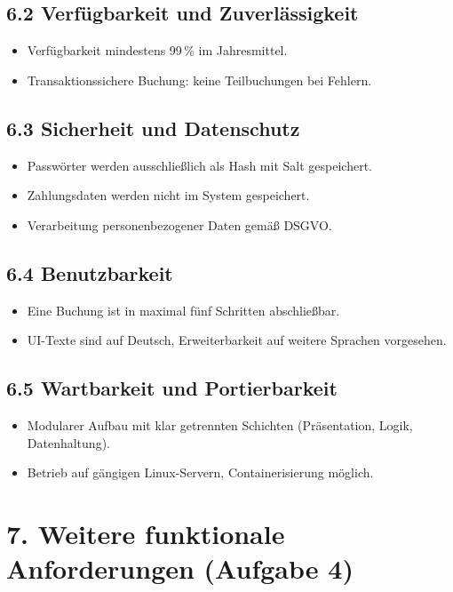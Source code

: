 \documentclass[
	fontsize=12pt,          %
	paper=a4,               %
	numbers=noenddot,       %
	listof=totoc,           %
	listof=entryprefix,     %
	listof=nochaptergap,    %
	bibliography=totoc,     %
	parskip=half,           %
	openany                 %
]{scrbook}
\begin{document}
\section*{6.2 Verfügbarkeit und Zuverlässigkeit}

\begin{itemize}
	\item Verfügbarkeit mindestens 99\,\% im Jahresmittel.
	\item Transaktionssichere Buchung: keine Teilbuchungen bei Fehlern.
\end{itemize}


\section*{6.3 Sicherheit und Datenschutz}

\begin{itemize}
	\item Passwörter werden ausschließlich als Hash mit Salt gespeichert.
	\item Zahlungsdaten werden nicht im System gespeichert.
	\item Verarbeitung personenbezogener Daten gemäß DSGVO.
\end{itemize}


\section*{6.4 Benutzbarkeit}

\begin{itemize}
	\item Eine Buchung ist in maximal fünf Schritten abschließbar.
	\item UI-Texte sind auf Deutsch, Erweiterbarkeit auf weitere Sprachen vorgesehen.
\end{itemize}


\section*{6.5 Wartbarkeit und Portierbarkeit}

\begin{itemize}
	\item Modularer Aufbau mit klar getrennten Schichten (Präsentation, Logik, Datenhaltung).
	\item Betrieb auf gängigen Linux-Servern, Containerisierung möglich.
\end{itemize}


\chapter*{7. Weitere funktionale Anforderungen \normalfont\normalsize(Aufgabe 4)}
\end{document}
